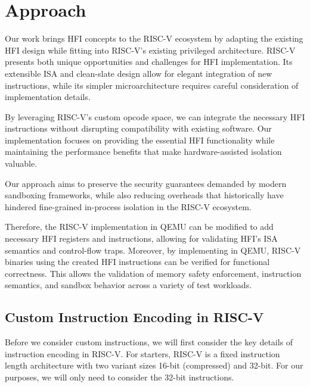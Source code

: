 \documentclass[conference,compsoc]{IEEEtran}
\begin{document}
\section{Approach}
\label{sec:approach}

Our work brings HFI concepts to the RISC-V ecosystem by adapting the existing HFI design while fitting into RISC-V's existing privileged architecture. 
RISC-V presents both unique opportunities and challenges for HFI implementation. Its extensible ISA and clean-slate design allow for elegant integration of new instructions, while its simpler microarchitecture requires careful consideration of implementation details.

By leveraging RISC-V's custom opcode space, we can integrate the necessary HFI instructions without disrupting compatibility with existing software. 
Our implementation focuses on providing the essential HFI functionality while maintaining the performance benefits that make hardware-assisted isolation valuable.

Our approach aims to preserve the security guarantees demanded by modern sandboxing frameworks, while also reducing overheads that historically have hindered fine-grained in-process isolation in the RISC-V ecosystem.

Therefore, the RISC-V implementation in QEMU can be modified to add necessary HFI registers and instructions, allowing for validating HFI's ISA semantics and control-flow traps. 
Moreover, by implementing in QEMU, RISC-V binaries using the created HFI instructions can be verified for functional correctness.
This allows the validation of memory safety enforcement, instruction semantics, and sandbox behavior across a variety of test workloads.

\subsection{Custom Instruction Encoding in RISC-V}
Before we consider custom instructions, we will first consider the key details of instruction encoding in RISC-V.
For starters, RISC-V is a fixed instruction length architecture with two variant sizes 16-bit (compressed) and 32-bit.
For our purposes, we will only need to consider the 32-bit instructions.
\end{document}
